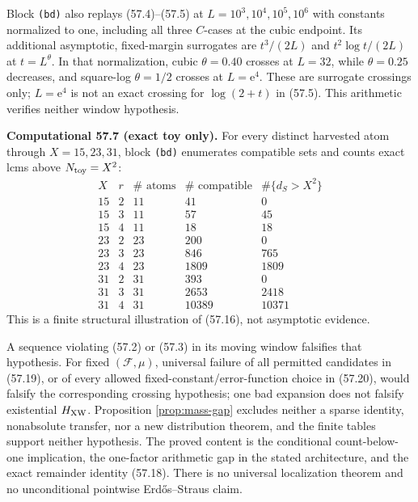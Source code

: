 \documentclass[10pt,reqno]{amsart}
\theoremstyle{definition}
\newcommand{\e}{\mathrm e}
\newcommand{\1}{\mathbf 1}
\begin{document}
Block \texttt{(bd)} also replays (57.4)--(57.5) at
$L=10^3,10^4,10^5,10^6$ with constants normalized to one, including all
three $C$-cases at the cubic endpoint.  Its additional asymptotic,
fixed-margin surrogates are $t^3/(2L)$ and $t^2\log t/(2L)$ at
$t=L^\theta$.  In that normalization, cubic $\theta=0.40$ crosses at
$L=32$, while $\theta=0.25$ decreases, and square-log $\theta=1/2$ crosses
at $L=\e^4$.  These are surrogate crossings only; $L=\e^4$ is not an exact
crossing for $\log(2+t)$ in (57.5).  This arithmetic verifies neither window
hypothesis.

\medskip\noindent\textbf{Computational 57.7 (exact toy only).}
For every distinct harvested atom through $X=15,23,31$, block \texttt{(bd)}
enumerates compatible sets and counts exact lcms above
$N_{\rm toy}=X^2$:
\begin{equation}\tag{57.24}
\begin{array}{c|r|r|r|r}
X&r&\#\text{ atoms}&\#\text{ compatible}&\#\{d_S>X^2\}\\ \hline
15&2&11&41&0\\15&3&11&57&45\\15&4&11&18&18\\
23&2&23&200&0\\23&3&23&846&765\\23&4&23&1809&1809\\
31&2&31&393&0\\31&3&31&2653&2418\\31&4&31&10389&10371
\end{array}
\end{equation}
This is a finite structural illustration of (57.16), not asymptotic
evidence.

A sequence violating (57.2) or (57.3) in its moving window falsifies that
hypothesis.  For fixed $(\mathscr F,\mu)$, universal failure of all permitted
candidates in (57.19), or of every allowed fixed-constant/error-function
choice in (57.20), would falsify the corresponding crossing hypothesis; one
bad expansion does not falsify existential $H_{\rm XW}$.  Proposition
\ref{prop:mass-gap} excludes neither a sparse identity, nonabsolute transfer,
nor a new distribution theorem, and the finite tables support neither
hypothesis.  The proved content is the conditional count-below-one
implication, the one-factor arithmetic gap in the stated architecture, and
the exact remainder identity (57.18).  There is no universal localization
theorem and no unconditional pointwise Erd\H{o}s--Straus claim.
\end{document}
